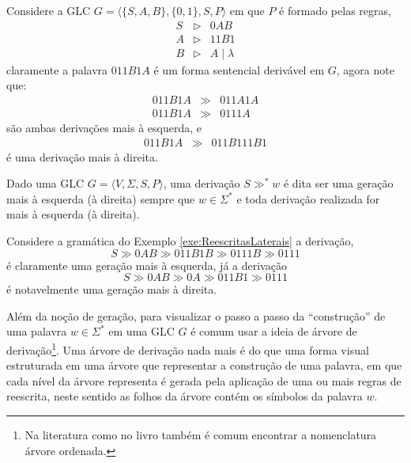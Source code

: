 \begin{exem}\label{exe:ReescritasLaterais}
	Considere a GLC $G = \langle \{S, A, B\}, \{0, 1\}, S, P\rangle$ em que $P$ é formado pelas regras,
	\begin{eqnarray*}
		S & \rhd & 0AB\\
		A & \rhd & 11B1 \\
		B & \rhd & A \mid \lambda 
	\end{eqnarray*}
	claramente a palavra $011B1A$ é um forma sentencial derivável em $G$, agora note que:
	\begin{eqnarray*}
		011B1A & \gg & 011A1A\\
		011B1A & \gg & 0111A
	\end{eqnarray*}
	são ambas derivações mais à esquerda, e 
	\begin{eqnarray*}
		011B1A & \gg & 011B111B1
	\end{eqnarray*}
	é uma derivação mais à direita.
\end{exem}

\begin{definition}\label{def:TipoGeracao}
	Dado uma GLC $G = \langle V, \Sigma, S, P\rangle$,  uma derivação $S \gg^* w$ é dita ser uma geração mais à esquerda (à direita) sempre que $w \in \Sigma^*$ e toda derivação realizada for mais à esquerda (à direita).
\end{definition}

\begin{exem}\label{exe:TipoGeracao}
	Considere a gramática do Exemplo \ref{exe:ReescritasLaterais} a derivação, 
	$$S \gg 0AB \gg 011B1B \gg 0111B \gg 0111$$
	é claramente uma geração mais à esquerda, já a derivação
	$$S \gg 0AB \gg 0A \gg 011B1 \gg 0111$$
	é notavelmente uma geração mais à direita.
\end{exem}

Além da noção de geração, para visualizar o passo a passo da ``construção'' de uma palavra $w \in \Sigma^*$ em uma GLC $G$ é comum usar a ideia de árvore de derivação\footnote{Na literatura como no livro \cite{benjaLivro2010} também é comum encontrar a nomenclatura árvore ordenada.}. Uma árvore de derivação nada mais é do que uma forma visual estruturada em uma árvore que representar a construção de uma palavra, em que cada nível da árvore representa é gerada pela aplicação de uma ou mais regras de reescrita, neste sentido as folhos da árvore contém os símbolos da palavra $w$.

